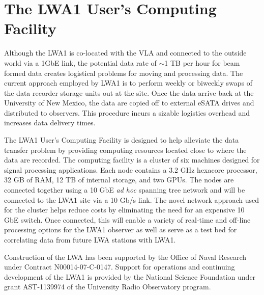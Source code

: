 \section{\label{P42_sec:LUCF}The LWA1 User's Computing Facility}
Although the LWA1 is co-located with the VLA and connected to the outside world via a 1GbE link, the potential data rate of $\sim$1 TB per hour for beam formed data creates logistical problems for moving and processing data.  The current approach employed by LWA1 is to perform weekly or biweekly swaps of the data recorder storage units out at the site.  Once the data arrive back at the University of New Mexico, the data are copied off to external eSATA drives and distributed to observers.  This procedure incurs a sizable logistics overhead and increases data delivery times.

The LWA1 User's Computing Facility is designed to help alleviate the data transfer problem by providing computing resources located close to where the data are recorded.  The computing facility is a cluster of  six machines designed for signal processing applications.  Each node contains a 3.2 GHz hexacore processor, 32 GB of RAM, 12 TB of internal storage, and two GPUs.  The nodes are connected together using a 10 GbE {\it ad hoc} spanning tree network and will be connected to the LWA1 site via a 10 Gb/s link.  The novel network approach used for the cluster helps reduce costs by eliminating the need for an expensive 10 GbE switch.  Once connected, this will enable a variety of real-time and off-line processing options for the LWA1 observer as well as serve as a test bed for correlating data from future LWA stations with LWA1.

\acknowledgments Construction of the LWA has been supported by the Office of Naval Research under Contract N00014-07-C-0147.  Support for operations and continuing development of the LWA1 is provided by the National Science Foundation under grant AST-1139974 of the University Radio Observatory program.


